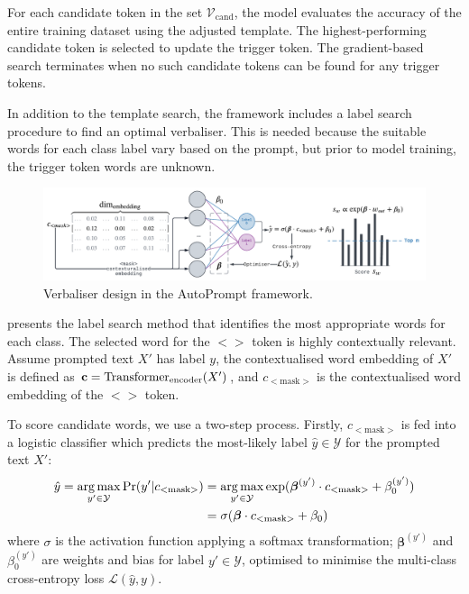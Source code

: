 For each candidate token in the set $\mathcal{V}_{\text{cand}}$, the model evaluates the accuracy of the entire training dataset using the adjusted template. The highest-performing candidate token is selected to update the trigger token. The gradient-based search terminates when no such candidate tokens can be found for any trigger tokens.

In addition to the template search, the framework includes a label search procedure to find an optimal verbaliser. This is needed because the suitable words for each class label vary based on the prompt, but prior to model training, the trigger token words are unknown.

\begin{figure}[!ht]
    \centering
    \includegraphics[width=\hsize]{figures/preparation_media/prepare-auto-verb.pdf}
    \caption{Verbaliser design in the AutoPrompt framework.}
    \label{fig:prepare-auto-verb}
\end{figure}

 presents the label search method that identifies the most appropriate words for each class. The selected word for the $<$$>$ token is highly contextually relevant. Assume prompted text $X'$ has label $y$, the contextualised word embedding of $X'$ is defined as $\bold{c} = \text{Transformer}_{\text{encoder}}(X')$, and $c_{<\text{mask}>}$ is the contextualised word embedding of the $<$$>$ token. 

To score candidate words, we use a two-step process. Firstly, $c_{<\text{mask}>}$ is fed into a logistic classifier which predicts the most-likely label $\hat{y} \in \mathcal{Y}$ for the prompted text $X'$:
\begin{equation}
\begin{split}
    \hat{y} = \operatorname*{arg\,max}_{y' \in \mathcal{Y}} \Pr(y'|c_{<\text{mask}>}) 
     & = \operatorname*{arg\,max}_{y' \in \mathcal{Y}} \exp(\boldsymbol{\beta}^{(y')} \cdot  c_{<\text{mask}>} + \beta_0^{(y')}) \\
    & = \sigma(\boldsymbol{\beta} \cdot c_{<\text{mask}>} + \beta_0)
\end{split}
\end{equation}
where $\sigma$ is the activation function applying a softmax transformation; $\boldsymbol{\beta}^(y')$ and $\beta_0^{(y')}$ are weights and bias for label $y' \in  \mathcal{Y}$, optimised to minimise the multi-class cross-entropy loss $\mathcal{L}(\hat{y}, y)$.

